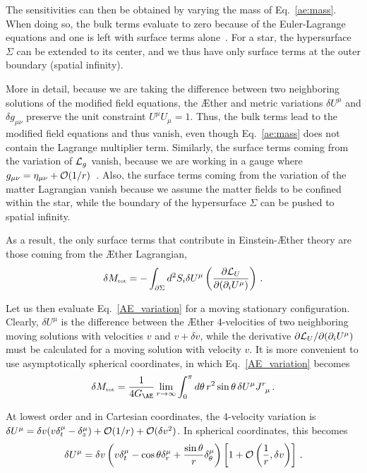 \documentclass[prd,aps,twocolumn,nofootinbib,showpacs,superscriptaddress]{revtex4-1}
\newcommand\be{\begin{equation}}
\newcommand\ee{\end{equation}}
\newcommand{\nn}{\nonumber}
\newcommand{\tot}{{\mbox{\tiny tot}}}
\begin{document}
The sensitivities can then be obtained by varying the mass of
Eq.~\eqref{ae:mass}.
When doing so, the bulk
terms evaluate to zero because of the Euler-Lagrange equations and one
is left with surface terms alone~\cite{damour_esposito_farese,Foster:2005fr,Blas:2011zd}. 
For a star, the hypersurface $\Sigma$ can be extended to
its center, and we thus have only surface terms at the
outer boundary (spatial infinity). 

More in detail, because we are taking
the difference between two neighboring solutions of the modified field
equations, the \AE ther and metric variations $\delta U^\mu$ and
$\delta g_{\mu\nu}$ preserve the unit constraint $U^\mu
U_\mu=1$. Thus, the bulk terms lead to the modified field
equations  and thus vanish, even though Eq.~\eqref{ae:mass} does not contain the
Lagrange multiplier term. Similarly, the surface terms coming from the
variation of ${\cal L}_{g_{{}}}$ vanish, because we are working in a gauge where
$g_{\mu\nu}=\eta_{\mu\nu}+{\cal O}(1/r)$~\cite{damour_esposito_farese}. Also, the surface terms
coming from the variation of the matter Lagrangian 
vanish because we assume the matter fields to be confined within the star, while the boundary of the
hypersurface $\Sigma$ can be pushed to spatial infinity.

As a result, the only surface terms that contribute in Einstein-\AE ther theory are those coming
from the \AE ther Lagrangian,
%
\be
\label{AE_variation}
\delta M_{\tot}=-\int_{\partial\Sigma} d^2S_i \delta U^\mu
\left(\frac{\partial {\cal L}_{U}}{\partial (\partial_i U^\mu)}
\right)\,.  \ee
%

Let us then evaluate Eq.~\eqref{AE_variation} for a moving stationary
configuration. Clearly, $\delta U ^{\mu}$ is the difference between
the \AE ther 4-velocities of two neighboring moving solutions with
velocities $v$ and $v+\delta v$, while the derivative $\partial {\cal
  L}_{U}/\partial (\partial_i U^\mu)$ must be calculated for a moving
solution with velocity $v$. It is more convenient to use
asymptotically spherical coordinates, in which
Eq.~\eqref{AE_variation} becomes 
\be
\label{AE_variation_explicit}
\delta M_{\tot}= \frac {1}{4 G_{\AE}}\lim_{r\to\infty} \int_{0}^\pi d\theta\, r^2
\sin\theta\, \delta U^\mu J^{r}_{\phantom{a}\mu}  \,.
\ee 

At lowest order and in Cartesian coordinates, the 4-velocity variation
is $\delta U^{\mu} = \delta v (v \delta^\mu_t-
\delta^\mu_z)+{\cal{O}}(1/r)+{\cal{O}}(\delta v^2)$. In spherical
coordinates, this becomes
%
\begin{align}
\delta U^{\mu} &= \delta v\left (v \delta^\mu_t- \cos\theta
\delta^\mu_r + \frac{\sin\theta}{r} \delta^\mu_\theta\right)
\left[1+{\cal O}\left(\frac1r,\delta v\right)\right]\nn\,.\\
\end{align}
%
\end{document}
